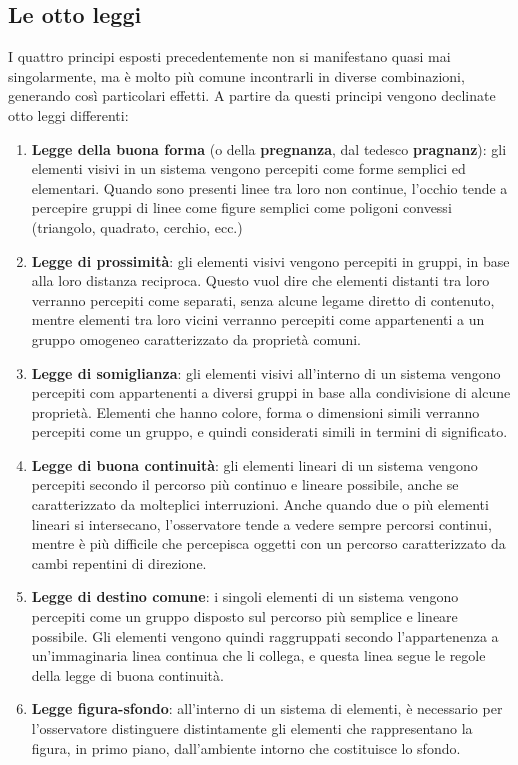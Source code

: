\documentclass[11pt,a4paper]{article}
\begin{document}
\subsection{Le otto leggi}
I quattro principi esposti precedentemente non si manifestano quasi mai singolarmente, ma è molto più comune incontrarli in diverse combinazioni, generando così particolari effetti. A partire da questi principi vengono declinate otto leggi differenti:
\begin{enumerate}
	\item \textbf{Legge della buona forma }(o della \textbf{pregnanza}, dal tedesco \textbf{pragnanz}): gli elementi visivi in un sistema vengono percepiti come forme semplici ed elementari. Quando sono presenti linee tra loro non continue, l'occhio tende a percepire gruppi di linee come figure semplici come poligoni convessi (triangolo, quadrato, cerchio, ecc.)
	\item \textbf{Legge di prossimità}: gli elementi visivi vengono percepiti in gruppi, in base alla loro distanza reciproca. Questo vuol dire che elementi distanti tra loro verranno percepiti come separati, senza alcune legame diretto di contenuto, mentre elementi tra loro vicini verranno percepiti come appartenenti a un gruppo omogeneo caratterizzato da proprietà comuni.
	\item \textbf{Legge di somiglianza}: gli elementi visivi all'interno di un sistema vengono percepiti com appartenenti a diversi gruppi in base alla condivisione di alcune proprietà. Elementi che hanno colore, forma o dimensioni simili verranno percepiti come un gruppo, e quindi considerati simili in termini di significato.
	\item \textbf{Legge di buona continuità}: gli elementi lineari di un sistema vengono percepiti secondo il percorso più continuo e lineare possibile, anche se caratterizzato da molteplici interruzioni. Anche quando due o più elementi lineari si intersecano, l'osservatore tende a vedere sempre percorsi continui, mentre è più difficile che percepisca oggetti con un percorso caratterizzato da cambi repentini di direzione.
	\item \textbf{ Legge di destino comune}: i singoli elementi di un sistema vengono percepiti come un gruppo disposto sul percorso più semplice e lineare possibile. Gli elementi vengono quindi raggruppati secondo l'appartenenza a un'immaginaria linea continua che li collega, e questa linea segue le regole della legge di buona continuità.
	\item \textbf{ Legge figura-sfondo}: all'interno di un sistema di elementi, è necessario per l'osservatore distinguere distintamente gli elementi che rappresentano la figura, in primo piano, dall'ambiente intorno che costituisce lo sfondo.

\end{enumerate}
\end{document}
